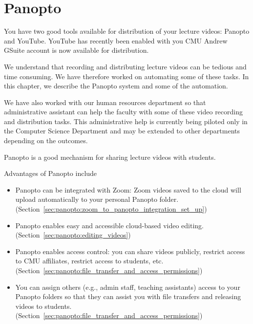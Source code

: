 \chapter{Panopto}
\label{ch:panopto}

\begin{preamble}
You have two good tools available for distribution of your lecture
videos: Panopto and YouTube.  YouTube has recently been enabled with
you CMU Andrew GSuite account is now available for distribution. 
%

We understand that recording and distributing lecture videos can be tedious and time consuming.  
%
We have therefore worked on automating some of these tasks.  In this
chapter, we describe the Panopto system and some of the automation.
%
 
%
We have also worked with our human resources department so that
administrative assistant can help the faculty with some of these video
recording and distribution tasks.
%
This administrative help is currently being piloted only in the
Computer Science Department and may be extended to other departments
depending on the outcomes.
\end{preamble}

\begin{gram}[Introduction]
\label{grm:panopto:introduction}


Panopto is a good mechanism for sharing lecture videos with students. 


Advantages of Panopto include 
	\begin{itemize}
		\item Panopto can be integrated with Zoom: Zoom videos saved to the cloud will upload automatically to your personal Panopto folder. (Section~\ref{sec:panopto:zoom_to_panopto_integration_set_up})
		\item Panopto enables easy and accessible cloud-based video editing. (Section~\ref{sec:panopto:editing_videos})
		\item Panopto enables access control: you can share videos publicly, restrict access to CMU affiliates, restrict access to students, etc. (Section~\ref{sec:panopto:file_transfer_and_access_permissions})
		\item You can assign others (e.g., admin staff, teaching assistants) access to your Panopto folders so that they can assist you with file transfers and releasing videos to students. (Section~\ref{sec:panopto:file_transfer_and_access_permissions})
	\end{itemize}
\end{gram}


